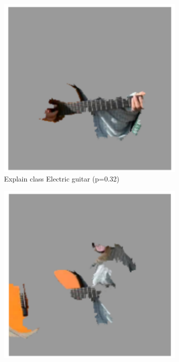 \begin{figure}[H]
\begin{subfigure}[t]{.23\textwidth}
        \includegraphics[width=\linewidth]{chapters/02_methods/images/lime_dog_2.png}
        \caption{Explain class Electric guitar (p=0.32)}
    \end{subfigure}\hfill%
    \begin{subfigure}[t]{.23\textwidth}
        \centering
        \includegraphics[width=\linewidth]{chapters/02_methods/images/lime_dog_3.png}

\end{subfigure}
\end{figure}
